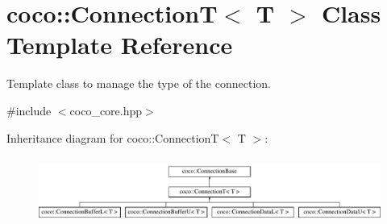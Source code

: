 \hypertarget{classcoco_1_1_connection_t}{}\section{coco\+:\+:Connection\+T$<$ T $>$ Class Template Reference}
\label{classcoco_1_1_connection_t}


Template class to manage the type of the connection.  




{\ttfamily \#include $<$coco\+\_\+core.\+hpp$>$}

Inheritance diagram for coco\+:\+:Connection\+T$<$ T $>$\+:\begin{figure}[H]
\begin{center}
\leavevmode
\includegraphics[height=2.187500cm]{classcoco_1_1_connection_t}
\end{center}
\end{figure}

